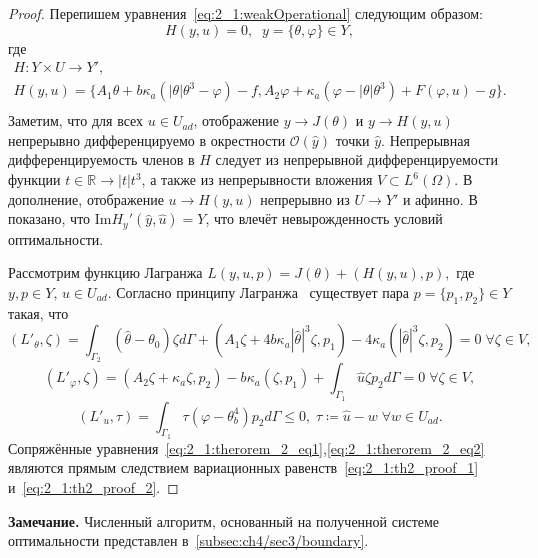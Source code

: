 \begin{proof}
    Перепишем уравнения~\eqref{eq:2_1:weakOperational} следующим образом:
    \[ H(y,u) = 0,\;\; y = \{\theta,\varphi\} \in Y, \]
    где
    \begin{gather*}
        H:Y \times U \to Y',\\
        H(y,u) =\{A_1 \theta + b \kappa_a (| \theta | \theta^3 - \varphi ) - f,
        A_2 \varphi + \kappa_a (\varphi - |\theta|\theta^3) + F(\varphi, u) - g \}.\\
    \end{gather*}
    Заметим, что для всех $u \in U_{ad}$, отображение
    $y \to J(\theta) $ и $y \to H(y,u)$ непрерывно
    дифференцируемо в окрестности $\mathcal{O}(\hat{y})$ точки $\hat{y}$.
    Непрерывная дифференцируемость членов в $H$ следует из непрерывной дифференцируемости
    функции $t \in \mathbb{R} \to | t | t^3$,
    а также из непрерывности вложения  $V \subset L^6(\Omega)$.
    В дополнение, отображение $u \to H(y,u)$ непрерывно из $U \to Y'$ и афинно.
    В~\cite{Kovtanyuk2014TheoreticalAnalysis} показано,
    что $\text{Im}H_y'(\hat{y}, \hat{u}) = Y$,
    что влечёт невырожденность условий оптимальности.

    Рассмотрим функцию Лагранжа
    $L(y,u,p) = J(\theta) + (H(y,u),p),$ где $y,p \in Y,\, u \in U_{ad}$.
    Согласно принципу Лагранжа~\cite[Гл.2, Теорема 1.5]{11}
    существует пара $p = \{p_1,p_2\} \in Y$ такая, что
    \begin{equation}
        \label{eq:2_1:th2_proof_1}
        (L'_\theta,\zeta) =\int_{\Gamma_2}(\hat\theta -\theta_0) \zeta d\Gamma
        + (A_1 \zeta + 4b\kappa_a |\hat\theta|^3 \zeta,p_1)
        - 4\kappa_a(|\hat\theta|^3 \zeta,p_2) = 0 \; \forall \zeta \in V,
    \end{equation}
    \begin{equation}
        \label{eq:2_1:th2_proof_2}
        (L'_\varphi, \zeta) = (A_2 \zeta + \kappa_a \zeta, p_2)
        - b \kappa_a(\zeta,p_1)
        + \int_{\Gamma_1} \hat u \zeta p_2 d\Gamma = 0 \; \forall \zeta \in V,
    \end{equation}
    \begin{equation}
        \label{eq:2_1:th2_proof_3}
        (L'_u,\tau) = \int_{\Gamma_1} \tau (\varphi - \theta^4_b) p_2 d\Gamma  \leq 0,
        \; \tau \coloneqq \hat u - w \; \forall w \in U_{ad}.
    \end{equation}
    Сопряжённые уравнения~\eqref{eq:2_1:therorem_2_eq1},\eqref{eq:2_1:therorem_2_eq2}
    являются прямым следствием
    вариационных равенств~\eqref{eq:2_1:th2_proof_1} и~\eqref{eq:2_1:th2_proof_2}.
\end{proof}

\textbf{Замечание.} Численный алгоритм, основанный на полученной системе
оптимальности представлен в~\ref{subsec:ch4/sec3/boundary}.
\FloatBarrier
